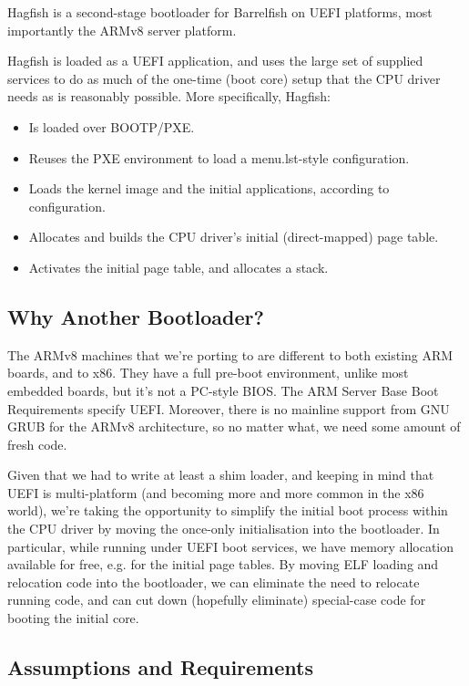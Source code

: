 \documentclass[a4paper,twoside]{report}
\begin{document}
Hagfish is a second-stage bootloader for Barrelfish on UEFI platforms, most
importantly the ARMv8 server platform.

Hagfish is loaded as a UEFI application, and uses the large set of supplied
services to do as much of the one-time (boot core) setup that the CPU driver
needs as is reasonably possible. More specifically, Hagfish:

\begin{itemize}
\item Is loaded over BOOTP/PXE.
\item Reuses the PXE environment to load a menu.lst-style configuration.
\item Loads the kernel image and the initial applications, according to
configuration.
\item Allocates and builds the CPU driver's initial (direct-mapped) page
table.
\item Activates the initial page table, and allocates a stack.
\end{itemize}

\subsection{Why Another Bootloader?}

The ARMv8 machines that we're porting to are different to both existing ARM
boards, and to x86. They have a full pre-boot environment, unlike most
embedded boards, but it's not a PC-style BIOS. The ARM Server Base Boot
Requirements specify UEFI. Moreover, there is no mainline support from GNU
GRUB for the ARMv8 architecture, so no matter what, we need some amount of
fresh code.

Given that we had to write at least a shim loader, and keeping in mind that
UEFI is multi-platform (and becoming more and more common in the x86 world),
we're taking the opportunity to simplify the initial boot process within the
CPU driver by moving the once-only initialisation into the bootloader. In
particular, while running under UEFI boot services, we have memory allocation
available for free, e.g. for the initial page tables. By moving ELF loading
and relocation code into the bootloader, we can eliminate the need to relocate
running code, and can cut down (hopefully eliminate) special-case code for
booting the initial core.

\subsection{Assumptions and Requirements}
\end{document}
